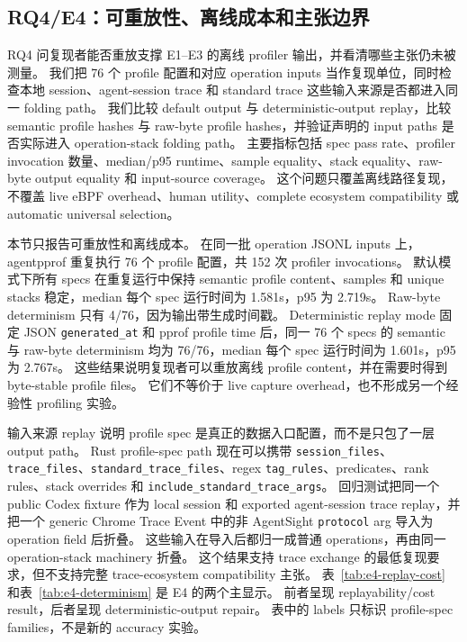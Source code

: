 \documentclass[10pt,twocolumn]{ctexart}
\newcommand{\toolname}{agentpprof}
\begin{document}
\subsection{RQ4/E4：可重放性、离线成本和主张边界}

RQ4 问复现者能否重放支撑 E1--E3 的离线 profiler 输出，并看清哪些主张仍未被测量。
我们把 76 个 profile 配置和对应 operation inputs 当作复现单位，同时检查本地 session、agent-session trace 和 standard trace 这些输入来源是否都进入同一 folding path。
我们比较 default output 与 deterministic-output replay，比较 semantic profile hashes 与 raw-byte profile hashes，并验证声明的 input paths 是否实际进入 operation-stack folding path。
主要指标包括 spec pass rate、profiler invocation 数量、median/p95 runtime、sample equality、stack equality、raw-byte output equality 和 input-source coverage。
这个问题只覆盖离线路径复现，不覆盖 live eBPF overhead、human utility、complete ecosystem compatibility 或 automatic universal selection。

本节只报告可重放性和离线成本。
在同一批 operation JSONL inputs 上，\toolname{} 重复执行 76 个 profile 配置，共 152 次 profiler invocations。
默认模式下所有 specs 在重复运行中保持 semantic profile content、samples 和 unique stacks 稳定，median 每个 spec 运行时间为 1.581s，p95 为 2.719s。
Raw-byte determinism 只有 4/76，因为输出带生成时间戳。
Deterministic replay mode 固定 JSON \texttt{generated\_at} 和 pprof profile time 后，同一 76 个 specs 的 semantic 与 raw-byte determinism 均为 76/76，median 每个 spec 运行时间为 1.601s，p95 为 2.767s。
这些结果说明复现者可以重放离线 profile content，并在需要时得到 byte-stable profile files。
它们不等价于 live capture overhead，也不形成另一个经验性 profiling 实验。

输入来源 replay 说明 profile spec 是真正的数据入口配置，而不是只包了一层 output path。
Rust profile-spec path 现在可以携带 \texttt{session\_files}、\texttt{trace\_files}、\texttt{standard\_trace\_files}、regex \texttt{tag\_rules}、predicates、rank rules、stack overrides 和 \texttt{include\_standard\_trace\_args}。
回归测试把同一个 public Codex fixture 作为 local session 和 exported agent-session trace replay，并把一个 generic Chrome Trace Event 中的非 AgentSight \texttt{protocol} arg 导入为 operation field 后折叠。
这些输入在导入后都归一成普通 operations，再由同一 operation-stack machinery 折叠。
这个结果支持 trace exchange 的最低复现要求，但不支持完整 trace-ecosystem compatibility 主张。
表~\ref{tab:e4-replay-cost} 和表~\ref{tab:e4-determinism} 是 E4 的两个主显示。
前者呈现 replayability/cost result，后者呈现 deterministic-output repair。
表中的 labels 只标识 profile-spec families，不是新的 accuracy 实验。
\end{document}
